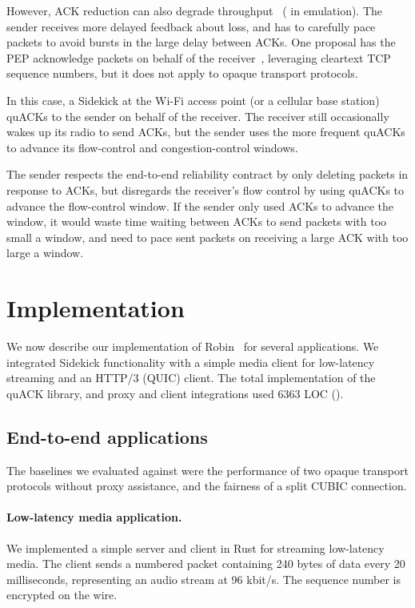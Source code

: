 However, ACK reduction can also degrade throughput~\cite{custura2023reducing,custura2020impact}
( in emulation).
The sender receives more delayed feedback about loss, and has to carefully
pace packets to avoid bursts in the large delay between ACKs.
One proposal has the PEP acknowledge packets on behalf of the
receiver~\cite{kliazovich2012arqproxy}, leveraging cleartext TCP sequence
numbers, but it does not apply to opaque transport protocols.

In this case, a Sidekick at the Wi-Fi access point (or a cellular base station)
quACKs to the sender on behalf of the receiver. The receiver still occasionally
wakes up its radio to send ACKs, but the sender uses the more frequent quACKs
to advance its flow-control and congestion-control windows.

The sender respects the end-to-end reliability contract by only deleting packets
in response to ACKs, but disregards the receiver's flow control by using quACKs
to advance the flow-control window. If the sender only used ACKs to advance the
window, it would waste time waiting between ACKs to send packets with too small
a window, and need to pace sent packets on receiving a large ACK with too large
a window.

\section{Implementation}
\label{sec:sidekick:implementation}



We now describe our implementation of Robin~\cite{sidekick-github} for several applications.
We integrated Sidekick functionality with a simple media client for low-latency streaming
and an HTTP/3 (QUIC) client.
The total implementation of the quACK library, and proxy and client
integrations used 6363 LOC ().

\subsection{End-to-end applications}
\label{sec:sidekick:implementation:applications}

The baselines we evaluated against were the performance of two opaque transport
protocols without proxy assistance, and the fairness of a split CUBIC connection.

\paragraph{Low-latency media application.}
We implemented a simple server and client in Rust for streaming low-latency
media. The client sends a numbered packet containing 240 bytes of data every
20 milliseconds, representing an audio stream at 96 kbit/s.
The sequence number is encrypted on the wire.


